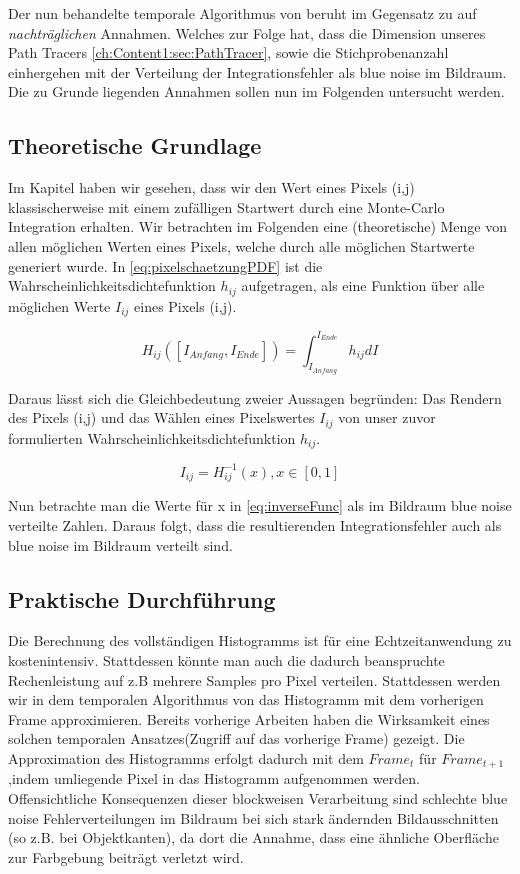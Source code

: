 Der nun behandelte temporale Algorithmus von \cite{hal02158423} beruht 
im Gegensatz zu \cite{georgiev2016blue} auf \textit{nachträglichen} 
Annahmen. Welches zur Folge hat, dass die Dimension unseres Path Tracers
\ref{ch:Content1:sec:PathTracer}, sowie die Stichprobenanzahl einhergehen 
mit der Verteilung der Integrationsfehler als blue noise im Bildraum.
Die zu Grunde liegenden Annahmen sollen nun im Folgenden untersucht werden.

\subsection{Theoretische Grundlage}
Im Kapitel  haben wir gesehen, dass 
wir den Wert eines Pixels (i,j) klassischerweise mit einem zufälligen
Startwert durch eine Monte-Carlo Integration erhalten. Wir betrachten im
Folgenden eine (theoretische) Menge von allen möglichen Werten eines 
Pixels, welche durch alle möglichen Startwerte generiert wurde.
In \ref{eq:pixelschaetzungPDF} ist die Wahrscheinlichkeitsdichtefunktion
$h_{ij}$ aufgetragen, als eine Funktion über alle möglichen Werte 
$I_{ij}$ eines Pixels (i,j).

\begin{equation}\label{eq:pixelschaetzungPDF}
    H_{ij}([I_{Anfang},I_{Ende}]) = \int_{I_{Anfang}}^{I_{Ende}} h_{ij} dI
\end{equation}

Daraus lässt sich die Gleichbedeutung zweier Aussagen begründen:
Das Rendern des Pixels (i,j) und das Wählen eines Pixelswertes $I_{ij}$
von unser zuvor formulierten Wahrscheinlichkeitsdichtefunktion $h_{ij}$.

\begin{equation}\label{eq:inverseFunc}
    I_{ij} = H_{ij}^{-1}(x), x \in [0,1]
\end{equation}

Nun betrachte man die Werte für x in \ref{eq:inverseFunc} als im Bildraum
blue noise verteilte Zahlen. Daraus folgt, dass die resultierenden
Integrationsfehler auch als blue noise im Bildraum verteilt sind.


\subsection{Praktische Durchführung}
Die Berechnung des vollständigen Histogramms ist für eine Echtzeitanwendung
zu kostenintensiv. Stattdessen könnte man auch die dadurch beanspruchte 
Rechenleistung auf z.B mehrere Samples pro Pixel verteilen.
Stattdessen werden wir in dem temporalen Algorithmus von \cite{hal02158423}
das Histogramm mit dem vorherigen Frame approximieren. 
Bereits vorherige Arbeiten \cite{Schied:2018:GER:3273023.3233301} haben die 
Wirksamkeit eines solchen temporalen Ansatzes(Zugriff auf das vorherige Frame)
gezeigt. Die Approximation des Histogramms erfolgt dadurch mit dem $Frame_{t}$ 
für $Frame_{t+1}$,indem umliegende Pixel in das Histogramm aufgenommen werden.
Offensichtliche Konsequenzen dieser blockweisen Verarbeitung sind schlechte blue noise 
Fehlerverteilungen im Bildraum bei sich stark ändernden Bildausschnitten
(so z.B. bei Objektkanten), da dort die Annahme, dass eine ähnliche Oberfläche
zur Farbgebung beiträgt verletzt wird.

